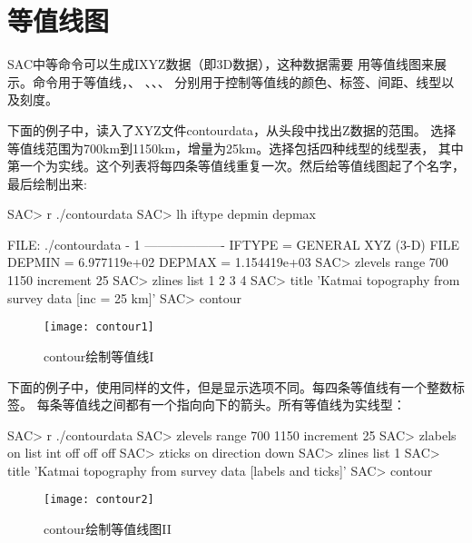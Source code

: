 \section{等值线图}
\label{sec:contour}
SAC中等命令可以生成IXYZ数据（即3D数据），这种数据需要
用等值线图来展示。命令用于等值线，、
、、、
分别用于控制等值线的颜色、标签、间距、线型以及刻度。

下面的例子中，读入了XYZ文件contourdata，从头段中找出Z数据的范围。
选择等值线范围为700km到1150km，增量为25km。选择包括四种线型的线型表，
其中第一个为实线。这个列表将每四条等值线重复一次。然后给等值线图起了个名字，最后绘制出来:
\begin{SACCode}
SAC> r ./contourdata 
SAC> lh iftype depmin depmax
  
  FILE: ./contourdata - 1
 -------------------
       IFTYPE = GENERAL XYZ (3-D) FILE
       DEPMIN = 6.977119e+02
       DEPMAX = 1.154419e+03
SAC> zlevels range 700 1150 increment 25
SAC> zlines list 1 2 3 4
SAC> title 'Katmai topography from survey data [inc = 25 km]'
SAC> contour
\end{SACCode}

\begin{figure}[H]
\centering
\texttt{[image: contour1]}
\caption{contour绘制等值线I}
\end{figure}

下面的例子中，使用同样的文件，但是显示选项不同。每四条等值线有一个整数标签。
每条等值线之间都有一个指向向下的箭头。所有等值线为实线型：
\begin{SACCode}
SAC> r ./contourdata 
SAC> zlevels range 700 1150 increment 25
SAC> zlabels on list int off off off
SAC> zticks on direction down
SAC> zlines list 1
SAC> title 'Katmai topography from survey data [labels and ticks]'
SAC> contour
\end{SACCode}

\begin{figure}[H]
\centering
\texttt{[image: contour2]}
\caption{contour绘制等值线图II}
\end{figure}
